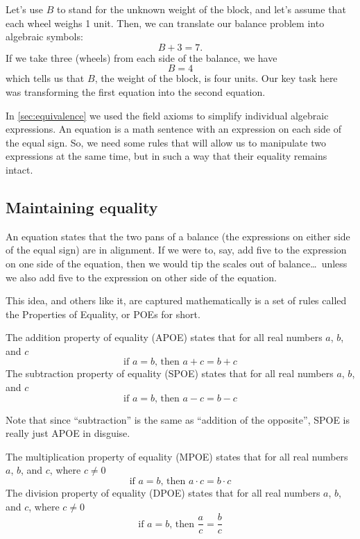 Let's use $B$ to stand for the unknown weight of the block, and let's assume that each wheel weighs 1 unit. Then, we can translate our balance problem into algebraic symbols: \[B + 3 = 7.\] If we take three (wheels) from each side of the balance, we have \[B = 4\] which tells us that $B$, the weight of the block, is four units. Our key task here was transforming the first equation into the second equation.

In \cref{sec:equivalence} we used the field axioms to simplify individual algebraic expressions. An equation is a math sentence with an expression on each side of the equal sign. So, we need some rules that will allow us to manipulate two expressions at the same time, but in such a way that their equality remains intact.

\subsection{Maintaining equality}

An equation states that the two pans of a balance (the expressions on either side of the equal sign) are in alignment. If we were to, say, add five to the expression on one side of the equation, then we would tip the scales out of balance\ldots\ unless we also add five to the expression on other side of the equation.

This idea, and others like it, are captured mathematically is a set of rules called the Properties of Equality, or POEs for short.

\begin{boxeddef2col}
The \gls{addition property of equality} (APOE) states that for all real numbers $a$, $b$, and $c$ \[\text{if } a = b \text{, then } a + c = b + c\]
\tcblower
The \gls{subtraction property of equality} (SPOE) states that for all real numbers $a$, $b$, and $c$\[\text{if } a = b \text{, then } a - c = b - c\]
\end{boxeddef2col}

Note that since ``subtraction'' is the same as ``addition of the opposite'', SPOE is really just APOE in disguise.

\begin{boxeddef2col}
The \gls{multiplication property of equality} (MPOE) states that for all real numbers $a$, $b$, and $c$, where $c\neq 0$ \[\text{if } a = b \text{, then } a \cdot c = b \cdot c\]
\tcblower
The \gls{division property of equality} (DPOE) states that for all real numbers $a$, $b$, and $c$, where $c\neq 0$ \[\text{if } a = b \text{, then } \frac{a}{c} = \frac{b}{c}\]
\end{boxeddef2col}

